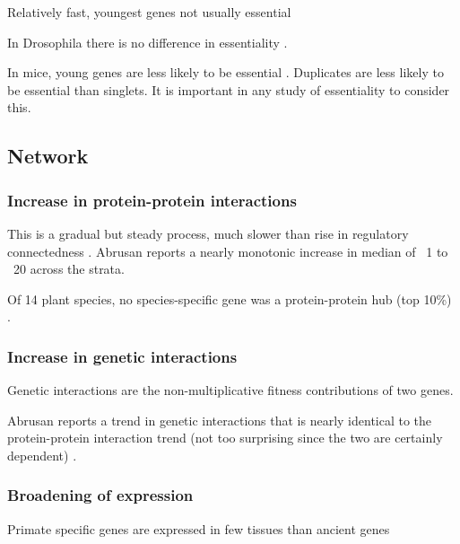     Relatively fast, youngest genes not usually essential
    \cite{abrusan_integration_2013}

    In Drosophila there is no difference in essentiality
    \cite{chen_new_2010}. 

    In mice, young genes are less likely to be essential
    \cite{chen_younger_2012}. Duplicates are less likely to be essential
    than singlets. It is important in any study of essentiality to consider
    this.



    \FloatBarrier

\subsection{Network}

  \subsubsection{Increase in protein-protein interactions}

    This is a gradual but steady process, much slower than rise in
    regulatory connectedness \cite{abrusan_integration_2013}. Abrusan
    reports a nearly monotonic increase in median of ~1 to ~20 across
    the strata.

    Of 14 plant species, no species-specific gene was a protein-protein
    hub (top 10\%) \cite{ye_evolutionary_2013}.

    \FloatBarrier

  \subsubsection{Increase in genetic interactions}

    Genetic interactions are the non-multiplicative fitness
    contributions of two genes.

    Abrusan reports a trend in genetic interactions that is nearly
    identical to the protein-protein interaction trend (not too
    surprising since the two are certainly dependent)
    \cite{abrusan_integration_2013}.

  \subsubsection{Broadening of expression}

    Primate specific genes are expressed in few tissues than ancient
    genes \cite{toll-riera_origin_2009}

